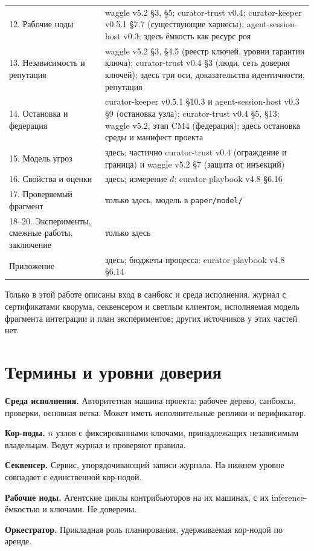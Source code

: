 \documentclass[11pt,a4paper]{article}
\begin{document}
{\begin{longtable}{p{3.4cm} p{10.0cm}}
12. Рабочие ноды & waggle v5.2 §3, §5; curator-trust v0.4; curator-keeper v0.5.1 §7.7 (существующие харнесы); agent-session-host v0.3; здесь ёмкость как ресурс роя \\
13. Независимость и репутация & waggle v5.2 §3, §4.5 (реестр ключей, уровни гарантии ключа); curator-trust v0.4 §3 (люди, сеть доверия ключей); здесь три оси, доказательства идентичности, репутация \\
14. Остановка и федерация & curator-keeper v0.5.1 §10.3 и agent-session-host v0.3 §9 (остановка узла); curator-trust v0.4 §5, §13; waggle v5.2, этап CM4 (федерация); здесь остановка среды и манифест проекта \\
15. Модель угроз & здесь; частично curator-trust v0.4 (ограждение и граница) и waggle v5.2 §7 (защита от инъекций) \\
16. Свойства и оценки & здесь; измерение $d$: curator-playbook v4.8 §6.16 \\
17. Проверяемый фрагмент & только здесь, модель в \texttt{paper/model/} \\
18--20. Эксперименты, смежные работы, заключение & только здесь \\
Приложение & здесь; бюджеты процесса: curator-playbook v4.8 §6.14 \\
\end{longtable}
}

Только в этой работе описаны вход в санбокс и среда исполнения, журнал с сертификатами кворума, секвенсером и светлым клиентом, исполняемая модель фрагмента интеграции и план экспериментов; других источников у этих частей нет.

\section{Термины и уровни доверия}

\textbf{Среда исполнения.} Авторитетная машина проекта: рабочее дерево, санбоксы, проверки, основная ветка. Может иметь исполнительные реплики и верификатор.

\textbf{Кор-ноды.} $n$ узлов с фиксированными ключами, принадлежащих независимым владельцам. Ведут журнал и проверяют правила.

\textbf{Секвенсер.} Сервис, упорядочивающий записи журнала. На нижнем уровне совпадает с единственной кор-нодой.

\textbf{Рабочие ноды.} Агентские циклы контрибьюторов на их машинах, с их inference-ёмкостью и ключами. Не доверены.

\textbf{Оркестратор.} Прикладная роль планирования, удерживаемая кор-нодой по аренде.
\end{document}
